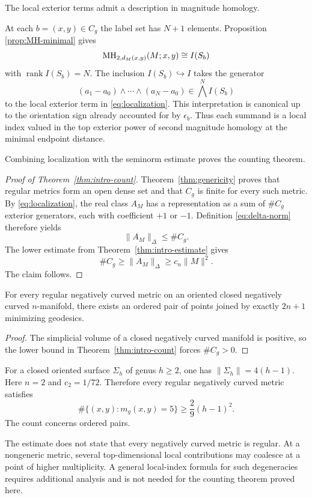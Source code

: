 The local exterior terms admit a description in magnitude homology.

At each $b=(x,y)\in C_g$ the label set has
$N+1$ elements. Proposition
\ref{prop:MH-minimal} gives
\[
 \mathrm{MH}_{2,d_M(x,y)}(M;x,y)\cong I(S_b)
\]
with $\operatorname{rank}I(S_b)=N$.
The inclusion $I(S_b)\hookrightarrow I$
takes the generator
\[
 (a_1-a_0)\wedge\cdots\wedge(a_N-a_0)
 \in\bigwedge^N I(S_b)
\]
to the local exterior term in
\eqref{eq:localization}.
This interpretation is canonical up to the
orientation sign already accounted for
by $\epsilon_b$. Thus each summand is a
local index valued in the top exterior
power of second magnitude homology at
the minimal endpoint distance.

Combining localization with the seminorm estimate proves the counting theorem.

\begin{proof}[Proof of Theorem~\ref{thm:intro-count}]
Theorem~\ref{thm:genericity} proves that
regular metrics form an open dense set
and that $C_g$ is finite for every such metric.
By \eqref{eq:localization}, the real class
$A_M$ has a representation as a sum of
$\#C_g$ exterior generators, each with
coefficient $+1$ or $-1$. Definition
\eqref{eq:delta-norm} therefore yields
\[
 \|A_M\|_\Delta\leq\#C_g.
\]
The lower estimate from
Theorem~\ref{thm:intro-estimate} gives
\[
 \#C_g\geq\|A_M\|_\Delta
 \geq c_n\|M\|^2.
\]
The claim follows.
\end{proof}

\begin{corollary}\label{cor:top-multiplicity}
For every regular negatively curved metric on an
oriented closed negatively curved $n$-manifold,
there exists an ordered pair of points joined
by exactly $2n+1$ minimizing geodesics.
\end{corollary}

\begin{proof}
The simplicial volume of a closed negatively
curved manifold is positive, so the lower
bound in Theorem~\ref{thm:intro-count}
forces $\#C_g>0$.
\end{proof}

\begin{example}\label{ex:surface-count}
For a closed oriented surface $\Sigma_h$ of genus
$h\geq2$, one has $\|\Sigma_h\|=4(h-1)$.
Here $n=2$ and $c_2=1/72$. Therefore
every regular negatively curved metric satisfies
\[
 \#\{(x,y):m_g(x,y)=5\}
 \geq\frac{2}{9}(h-1)^2.
\]
The count concerns ordered pairs.
\end{example}

\begin{remark}
The estimate does not state that every negatively
curved metric is regular. At a nongeneric metric,
several top-dimensional local contributions may
coalesce at a point of higher multiplicity.
A general local-index formula for such degeneracies
requires additional analysis and is not needed
for the counting theorem proved here.
\end{remark}
